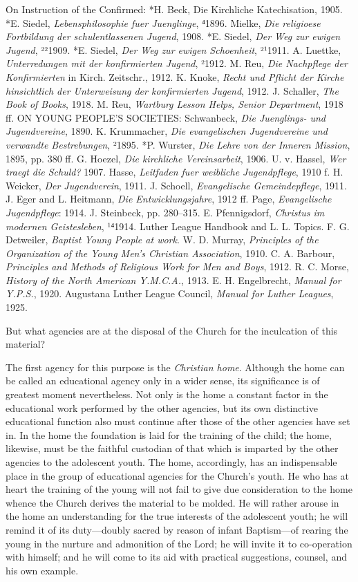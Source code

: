 On Instruction of the Confirmed: *H. Beck, Die Kirchliche Katechisation, 1905. *E.
Siedel, \emph{Lebensphilosophie fuer Juenglinge}, ⁴1896. Mielke, \emph{Die religioese Fortbildung der schulentlassenen Jugend}, 1908. *E. Siedel, \emph{Der Weg zur ewigen Jugend}, ²²1909. *E. Siedel, \emph{Der Weg zur ewigen Schoenheit}, ²¹1911. A. Luettke, \emph{Unterredungen mit der konfirmierten Jugend}, ²1912. M. Reu, \emph{Die Nachpflege der Konfirmierten} in Kirch. Zeitschr., 1912. K. Knoke, \emph{Recht und Pflicht der Kirche hinsichtlich der Unterweisung der konfirmierten Jugend}, 1912. J. Schaller, \emph{The Book of Books}, 1918. M. Reu, \emph{Wartburg Lesson Helps, Senior Department}, 1918 ff. ON YOUNG PEOPLE’S SOCIETIES: Schwanbeck, \emph{Die Juenglings- und Jugendvereine}, 1890. K. Krummacher, \emph{Die evangelischen Jugendvereine und verwandte Bestrebungen}, ²1895. *P. Wurster, \emph{Die Lehre von der Inneren Mission}, 1895, pp. 380 ff. G. Hoezel, \emph{Die kirchliche Vereinsarbeit}, 1906. U. v. Hassel, \emph{Wer traegt die Schuld?} 1907. Hasse, \emph{Leitfaden fuer weibliche Jugendpflege}, 1910 f. H. Weicker, \emph{Der Jugendverein}, 1911. J. Schoell, \emph{Evangelische Gemeindepflege}, 1911. J. Eger and L. Heitmann, \emph{Die Entwicklungsjahre}, 1912 ff. Page, \emph{Evangelische Jugendpflege}: 1914. J. Steinbeck, pp. 280–315. E. Pfennigsdorf, \emph{Christus im modernen Geistesleben}, ¹⁴1914. Luther League Handbook and L. L. Topics. F. G. Detweiler, \emph{Baptist Young People at work}. W. D. Murray, \emph{Principles of the Organization of the Young Men’s Christian Association}, 1910. C. A. Barbour, \emph{Principles and Methods of Religious Work for Men and Boys}, 1912. R. C. Morse, \emph{History of the North American Y.M.C.A.}, 1913. E. H. Engelbrecht, \emph{Manual for Y.P.S.}, 1920. Augustana Luther League Council, \emph{Manual for Luther Leagues}, 1925.

But what agencies are at the disposal of the Church for the inculcation of this material?

The first agency for this purpose is the \emph{Christian home}. Although the home can be called an educational agency only in a wider sense, its significance is of greatest moment nevertheless. Not only is the home a constant factor in the educational work performed by the other agencies, but its own distinctive educational function also must continue after those of the other agencies have set in. In the home the foundation is laid for the training of the child; the home, likewise, must be the faithful custodian of that which is imparted by the other agencies to the adolescent youth. The home, accordingly, has an indispensable place in the group of educational
agencies for the Church’s youth. He who has at heart the training of the young will not fail to give due consideration to the home whence the Church derives the material to be molded. He will rather arouse in the home an understanding for the true interests of the adolescent youth; he will remind it of its duty—doubly sacred by reason of infant Baptism—of rearing the young in the nurture and admonition of the Lord; he will invite it to co-operation with himself; and he will come to its aid with practical suggestions, counsel, and his own example.

